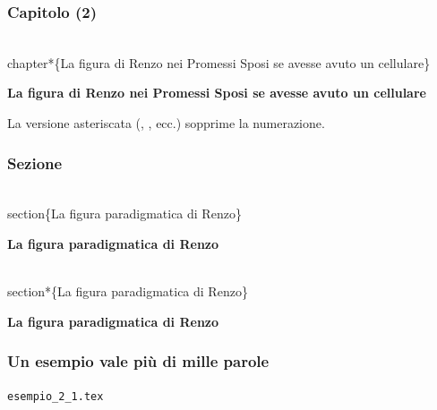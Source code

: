 \documentclass[svgnames,%
	ucs,%
	pdftex]{guitbeamer}
\begin{document}
\begin{frame}
  \frametitle{Capitolo (2)}
	\begin{LaTeXcode}
		\alert{\\chapter*\{}La figura di Renzo nei Promessi Sposi se avesse avuto un cellulare\alert{\}}
	\end{LaTeXcode}
	\begin{LaTeXoutput}\Large\bfseries
		\vspace{2ex}
		\noindent La figura di Renzo nei Promessi Sposi se avesse avuto un cellulare
	\end{LaTeXoutput}
  \bigskip
	La versione asteriscata	(, , ecc.) sopprime la
	numerazione. %
\end{frame}
\begin{frame}
  \frametitle{Sezione}
	\begin{LaTeXcode}
		\alert{\\section\{}La figura paradigmatica di Renzo\alert{\}}
	\end{LaTeXcode}
	\begin{LaTeXoutput}\Large\bfseries
		\quad La figura paradigmatica di Renzo
	\end{LaTeXoutput}
  \medskip
	\begin{LaTeXcode}
		\alert{\\section*\{}La figura paradigmatica di Renzo\alert{\}}
	\end{LaTeXcode}
	\begin{LaTeXoutput}\Large\bfseries
		\noindent La figura paradigmatica di Renzo
	\end{LaTeXoutput}
\end{frame}
\begin{frame}
  \frametitle{Un esempio vale pi\`u di mille parole}
	\begin{center}
		\alert{\texttt{esempio\_2\_1.tex}}
	\end{center}
\end{frame}
\end{document}
